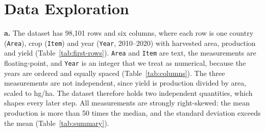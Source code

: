 \documentclass{article}
\begin{document}
\section{Data Exploration}

\textbf{a.}
The dataset has 98,101 rows and six columns, where each row is one country (\texttt{Area}), crop (\texttt{Item}) and year (\texttt{Year}, 2010--2020) with harvested area, production and yield (Table~\ref{tab:first-rows}). \texttt{Area} and \texttt{Item} are text, the measurements are floating-point, and \texttt{Year} is an integer that we treat as numerical, because the years are ordered and equally spaced (Table~\ref{tab:columns}). The three measurements are not independent, since yield is production divided by area, scaled to hg/ha. The dataset therefore holds two independent quantities, which shapes every later step. All measurements are strongly right-skewed: the mean production is more than 50 times the median, and the standard deviation exceeds the mean (Table~\ref{tab:summary}).

\begin{table}[H]
    \centering
    \caption{The first five rows.}
    \label{tab:first-rows}
\end{table}
\end{document}
